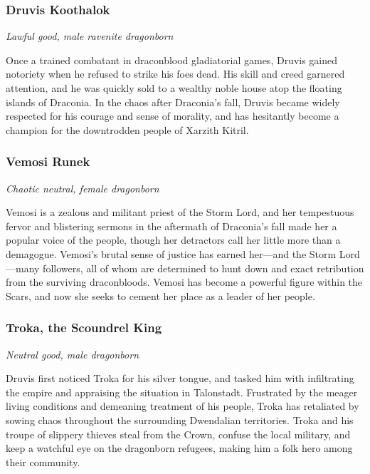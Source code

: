 \documentclass[10pt,a4paper,twoside,bg=print,twocolumn,openany,nodeprecatedcode]{dndbook}
\begin{document}
\subsubsection{Druvis Koothalok}
\textit{Lawful good, male ravenite dragonborn}

Once a trained combatant in draconblood gladiatorial games, Druvis gained notoriety when he refused to strike his foes dead. His skill and creed garnered attention, and he was quickly sold to a wealthy noble house atop the floating islands of Draconia. In the chaos after Draconia's fall, Druvis became widely respected for his courage and sense of morality, and has hesitantly become a champion for the downtrodden people of Xarzith Kitril.

\subsubsection{Vemosi Runek}
\textit{Chaotic neutral, female dragonborn}

Vemosi is a zealous and militant priest of the Storm Lord, and her tempestuous fervor and blistering sermons in the aftermath of Draconia's fall made her a popular voice of the people, though her detractors call her little more than a demagogue. Vemosi's brutal sense of justice has earned her—and the Storm Lord—many followers, all of whom are determined to hunt down and exact retribution from the surviving draconbloods. Vemosi has become a powerful figure within the Scars, and now she seeks to cement her place as a leader of her people.

\subsubsection{Troka, the Scoundrel King}
\textit{Neutral good, male dragonborn}

Druvis first noticed Troka for his silver tongue, and tasked him with infiltrating the empire and appraising the situation in Talonstadt. Frustrated by the meager living conditions and demeaning treatment of his people, Troka has retaliated by sowing chaos throughout the surrounding Dwendalian territories. Troka and his troupe of slippery thieves steal from the Crown, confuse the local military, and keep a watchful eye on the dragonborn refugees, making him a folk hero among their community.
\end{document}
